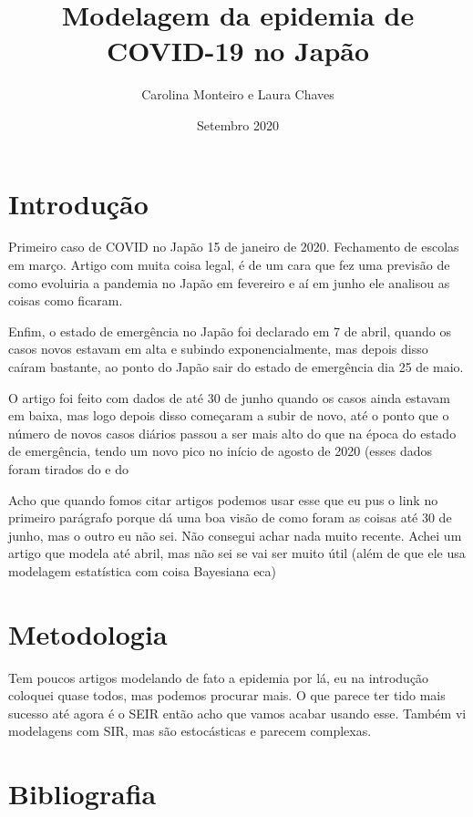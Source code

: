 \documentclass{article}
\title{Modelagem da epidemia de COVID-19 no Japão}
\author{Carolina Monteiro e Laura Chaves }
\date{Setembro 2020}
\begin{document}
\maketitle

\section{Introdução}

Primeiro caso de COVID no Japão 15 de janeiro de 2020.
Fechamento de escolas em março.
 Artigo com muita coisa legal, é de um cara que fez uma previsão de como evoluiria a pandemia no Japão em fevereiro e aí em junho ele analisou as coisas como ficaram.

Enfim, o estado de emergência no Japão foi declarado em 7 de abril, quando os casos novos estavam em alta e subindo exponencialmente, mas depois disso caíram bastante, ao ponto do Japão sair do estado de emergência dia 25 de maio.

O artigo foi feito com dados de até 30 de junho quando os casos ainda estavam em baixa, mas logo depois disso começaram a subir de novo, até o ponto que o número de novos casos diários passou a ser mais alto do que na época do estado de emergência, tendo um novo pico no início de agosto de 2020 (esses dados foram tirados do  e do 

Acho que quando fomos citar artigos podemos usar esse que eu pus o link no primeiro parágrafo porque dá uma boa visão de como foram as coisas até 30 de junho, mas o outro eu não sei. Não consegui achar nada muito recente. Achei um artigo que modela até abril, mas não sei se vai ser muito útil (além de que ele usa modelagem estatística com coisa Bayesiana eca)

\section{Metodologia}

Tem poucos artigos modelando de fato a epidemia por lá, eu na introdução coloquei quase todos, mas podemos procurar mais.
O que parece ter tido mais sucesso até agora é o SEIR então acho que vamos acabar usando esse. Também vi modelagens com SIR, mas são estocásticas e parecem complexas.

\section{Bibliografia}

\end{document}
